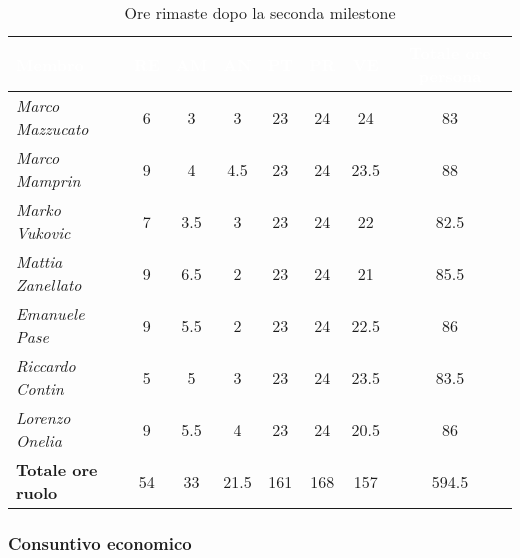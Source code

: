 \begin{table}[H]
    \renewcommand\arraystretch{1.5}
    \centering
    \begin{tabular}{|l|c|c|c|c|c|c|c|}
    \hline
    \rowcolor[HTML]{036400}
    \textcolor{white}{\textbf{Membro}} & \multicolumn{1}{c|}{\textcolor{white}{\textbf{RE}}} & \multicolumn{1}{c|}{\textcolor{white}{\textbf{AM}}} & \multicolumn{1}{c|}{\textcolor{white}{\textbf{AN}}} & \multicolumn{1}{c|}{\textcolor{white}{\textbf{PT}}} & \multicolumn{1}{c|}{\textcolor{white}{\textbf{PR}}} & \multicolumn{1}{c|}{\textcolor{white}{\textbf{VE}}} & \multicolumn{1}{c|}{\textcolor{white}{\textbf{Totale ore persona}}} \\ \hline
    \rowcolor[HTML]{EFEFEF}\textit{Marco Mazzucato}  & 6  & 3    & 3    & 23  & 24 & 24     & 83     \\ \hline
    \rowcolor[HTML]{C0C0C0}\textit{Marco Mamprin}    & 9  & 4    & 4.5  & 23  & 24 & 23.5   & 88     \\ \hline
    \rowcolor[HTML]{EFEFEF}\textit{Marko Vukovic}    & 7  & 3.5  & 3    & 23  & 24 & 22     & 82.5   \\ \hline
    \rowcolor[HTML]{C0C0C0}\textit{Mattia Zanellato} & 9  & 6.5  & 2    & 23  & 24 & 21     & 85.5   \\ \hline
    \rowcolor[HTML]{EFEFEF}\textit{Emanuele Pase}    & 9  & 5.5  & 2    & 23  & 24 & 22.5   & 86     \\ \hline
    \rowcolor[HTML]{C0C0C0}\textit{Riccardo Contin}  & 5  & 5    & 3    & 23  & 24 & 23.5   & 83.5   \\ \hline
    \rowcolor[HTML]{EFEFEF}\textit{Lorenzo Onelia}   & 9  & 5.5  & 4    & 23  & 24 & 20.5   & 86     \\ \hline
    \rowcolor[HTML]{C0C0C0}\textbf{Totale ore ruolo} & 54 & 33   & 21.5 & 161 & 168& 157    & 594.5  \\ \hline
    \end{tabular}
    \caption{Ore rimaste dopo la seconda milestone}
\end{table}

\subsubsection{Consuntivo economico}

